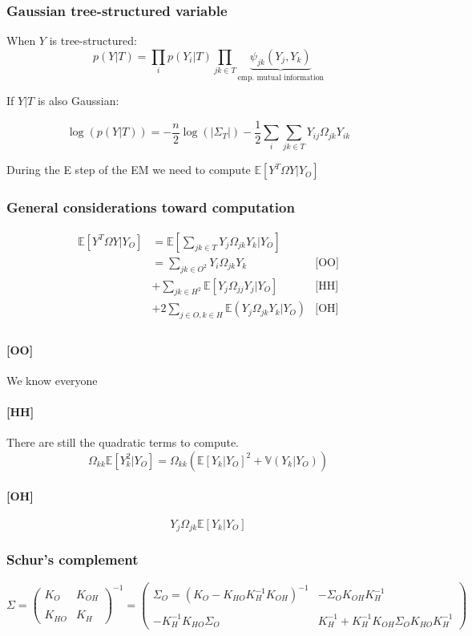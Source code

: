 \documentclass[11pt,a4paper]{article}
\newcommand{\Esp}{\mathds{E}}
\begin{document}
\subsubsection{Gaussian tree-structured variable}
When $Y$ is tree-structured:
$$ p(Y|T) = \prod_i  p(Y_i|T) \prod_{jk\in T} \underbrace{\psi_{jk}(Y_j,Y_k)}_{\text{emp. mutual  information}}$$

If $Y|T$ is also Gaussian:

$$\log(p(Y|T)) = -\frac{n}{2}\log(|\Sigma_T|) - \frac{1}{2} \sum_i\sum_{jk\in T} Y_{ij} \Omega_{jk} Y_{ik}$$

During the E step of the EM we need to compute $\Esp[Y^T\Omega Y|Y_O]$
\subsubsection{General considerations toward computation}
\begin{align*}
 \Esp[Y^T\Omega Y|Y_O] &=\Esp\left[\sum_{jk\in T } Y_j\Omega_{jk}Y_k|Y_O\right]&\\
& = \sum_{jk\in O^2} Y_i\Omega_{jk} Y_k & \text{[OO]}\\
&+\sum_{jk \in H^2} \Esp[Y_j\Omega_{jj}Y_j|Y_O] & \text{[HH]} \\
&+2 \sum_{j\in O, k \in H} \Esp(Y_j\Omega_{jk} Y_k |Y_O) & \text{[OH]}\\
\end{align*}

\paragraph{[OO]} We know everyone
\paragraph{[HH]} There are still the quadratic terms to compute. 
$$ \Omega_{kk} \Esp[Y_k^2|Y_O] = \Omega_{kk} \left( \Esp [Y_k|Y_O]^2 + \mathds{V}(Y_k|Y_O)\right)$$

\paragraph{[OH]}$$ Y_j\Omega_{jk}\Esp[Y_k|Y_O]$$

\subsubsection{Schur's complement}

\[
 \Sigma=
  \left( {\begin{array}{cc}
  K_O &  K_{OH}\\\\
  K_{HO} & K_H
  \end{array} } \right)^{-1} =
  \left( {\begin{array}{cc}
  \Sigma_O =( K_O - K_{HO}K_H^{-1}K_{OH})^{-1} &  - \Sigma_O K_{OH}K_H^{-1}\\\\
 -K_H^{-1}K_{HO}\Sigma_O & K_H^{-1}+K_H^{-1}K_{OH}\Sigma_OK_{HO}K_H^{-1}
  \end{array} } \right)
  \]
\end{document}
